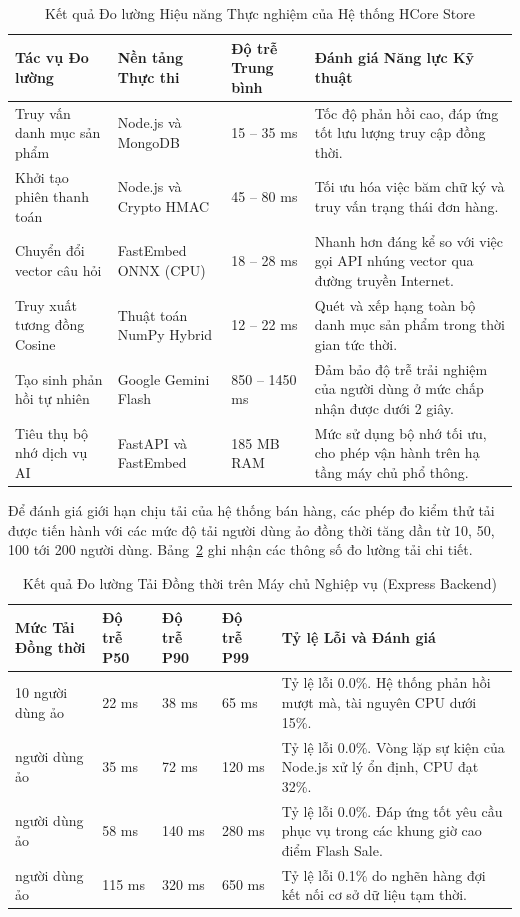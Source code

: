 \begin{table}[H]
\centering
\caption{Kết quả Đo lường Hiệu năng Thực nghiệm của Hệ thống HCore Store}
\label{tab:perf_metrics}
\begin{tabularx}{\textwidth}{p{4.2cm}p{3.2cm}p{2.5cm}X}
\toprule
\textbf{Tác vụ Đo lường} & \textbf{Nền tảng Thực thi} & \textbf{Độ trễ Trung bình} & \textbf{Đánh giá Năng lực Kỹ thuật} \\
\midrule
Truy vấn danh mục sản phẩm & Node.js và MongoDB & 15 – 35 ms & Tốc độ phản hồi cao, đáp ứng tốt lưu lượng truy cập đồng thời. \\
\addlinespace
Khởi tạo phiên thanh toán & Node.js và Crypto HMAC & 45 – 80 ms & Tối ưu hóa việc băm chữ ký và truy vấn trạng thái đơn hàng. \\
\addlinespace
Chuyển đổi vector câu hỏi & FastEmbed ONNX (CPU) & 18 – 28 ms & Nhanh hơn đáng kể so với việc gọi API nhúng vector qua đường truyền Internet. \\
\addlinespace
Truy xuất tương đồng Cosine & Thuật toán NumPy Hybrid & 12 – 22 ms & Quét và xếp hạng toàn bộ danh mục sản phẩm trong thời gian tức thời. \\
\addlinespace
Tạo sinh phản hồi tự nhiên & Google Gemini Flash & 850 – 1450 ms & Đảm bảo độ trễ trải nghiệm của người dùng ở mức chấp nhận được dưới 2 giây. \\
\addlinespace
Tiêu thụ bộ nhớ dịch vụ AI & FastAPI và FastEmbed & 185 MB RAM & Mức sử dụng bộ nhớ tối ưu, cho phép vận hành trên hạ tầng máy chủ phổ thông. \\
\bottomrule
\end{tabularx}
\end{table}

Để đánh giá giới hạn chịu tải của hệ thống bán hàng, các phép đo kiểm thử tải được tiến hành với các mức độ tải người dùng ảo đồng thời tăng dần từ 10, 50, 100 tới 200 người dùng. Bảng~\ref{tab:concurrency_stress} ghi nhận các thông số đo lường tải chi tiết.

\begin{table}[H]
\centering
\caption{Kết quả Đo lường Tải Đồng thời trên Máy chủ Nghiệp vụ (Express Backend)}
\label{tab:concurrency_stress}
\begin{tabularx}{\textwidth}{p{2.8cm}p{2.2cm}p{2.2cm}p{2.2cm}X}
\toprule
\textbf{Mức Tải Đồng thời} & \textbf{Độ trễ P50} & \textbf{Độ trễ P90} & \textbf{Độ trễ P99} & \textbf{Tỷ lệ Lỗi và Đánh giá} \\
\midrule
10 người dùng ảo & 22 ms & 38 ms & 65 ms & Tỷ lệ lỗi 0.0\%. Hệ thống phản hồi mượt mà, tài nguyên CPU dưới 15\%. \\
\addlinespace
50 người dùng ảo & 35 ms & 72 ms & 120 ms & Tỷ lệ lỗi 0.0\%. Vòng lặp sự kiện của Node.js xử lý ổn định, CPU đạt 32\%. \\
\addlinespace
100 người dùng ảo & 58 ms & 140 ms & 280 ms & Tỷ lệ lỗi 0.0\%. Đáp ứng tốt yêu cầu phục vụ trong các khung giờ cao điểm Flash Sale. \\
\addlinespace
200 người dùng ảo & 115 ms & 320 ms & 650 ms & Tỷ lệ lỗi 0.1\% do nghẽn hàng đợi kết nối cơ sở dữ liệu tạm thời. \\
\bottomrule
\end{tabularx}
\end{table}

